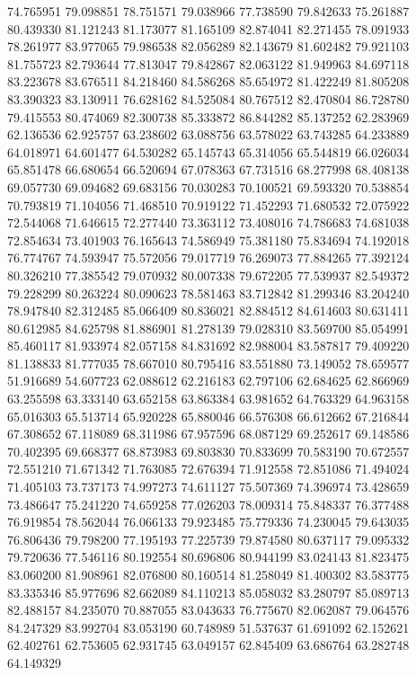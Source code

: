 74.765951
79.098851
78.751571
79.038966
77.738590
79.842633
75.261887
80.439330
81.121243
81.173077
81.165109
82.874041
82.271455
78.091933
78.261977
83.977065
79.986538
82.056289
82.143679
81.602482
79.921103
81.755723
82.793644
77.813047
79.842867
82.063122
81.949963
84.697118
83.223678
83.676511
84.218460
84.586268
85.654972
81.422249
81.805208
83.390323
83.130911
76.628162
84.525084
80.767512
82.470804
86.728780
79.415553
80.474069
82.300738
85.333872
86.844282
85.137252
62.283969
62.136536
62.925757
63.238602
63.088756
63.578022
63.743285
64.233889
64.018971
64.601477
64.530282
65.145743
65.314056
65.544819
66.026034
65.851478
66.680654
66.520694
67.078363
67.731516
68.277998
68.408138
69.057730
69.094682
69.683156
70.030283
70.100521
69.593320
70.538854
70.793819
71.104056
71.468510
70.919122
71.452293
71.680532
72.075922
72.544068
71.646615
72.277440
73.363112
73.408016
74.786683
74.681038
72.854634
73.401903
76.165643
74.586949
75.381180
75.834694
74.192018
76.774767
74.593947
75.572056
79.017719
76.269073
77.884265
77.392124
80.326210
77.385542
79.070932
80.007338
79.672205
77.539937
82.549372
79.228299
80.263224
80.090623
78.581463
83.712842
81.299346
83.204240
78.947840
82.312485
85.066409
80.836021
82.884512
84.614603
80.631411
80.612985
84.625798
81.886901
81.278139
79.028310
83.569700
85.054991
85.460117
81.933974
82.057158
84.831692
82.988004
83.587817
79.409220
81.138833
81.777035
78.667010
80.795416
83.551880
73.149052
78.659577
51.916689
54.607723
62.088612
62.216183
62.797106
62.684625
62.866969
63.255598
63.333140
63.652158
63.863384
63.981652
64.763329
64.963158
65.016303
65.513714
65.920228
65.880046
66.576308
66.612662
67.216844
67.308652
67.118089
68.311986
67.957596
68.087129
69.252617
69.148586
70.402395
69.668377
68.873983
69.803830
70.833699
70.583190
70.672557
72.551210
71.671342
71.763085
72.676394
71.912558
72.851086
71.494024
71.405103
73.737173
74.997273
74.611127
75.507369
74.396974
73.428659
73.486647
75.241220
74.659258
77.026203
78.009314
75.848337
76.377488
76.919854
78.562044
76.066133
79.923485
75.779336
74.230045
79.643035
76.806436
79.798200
77.195193
77.225739
79.874580
80.637117
79.095332
79.720636
77.546116
80.192554
80.696806
80.944199
83.024143
81.823475
83.060200
81.908961
82.076800
80.160514
81.258049
81.400302
83.583775
83.335346
85.977696
82.662089
84.110213
85.058032
83.280797
85.089713
82.488157
84.235070
70.887055
83.043633
76.775670
82.062087
79.064576
84.247329
83.992704
83.053190
60.748989
51.537637
61.691092
62.152621
62.402761
62.753605
62.931745
63.049157
62.845409
63.686764
63.282748
64.149329
